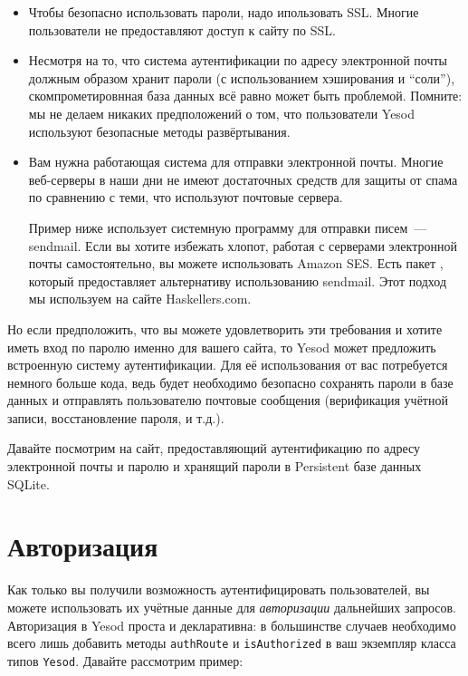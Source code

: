 \begin{itemize}
    \item Чтобы безопасно использовать пароли, надо ипользовать SSL. Многие пользователи не предоставляют доступ к сайту по SSL.

    \item Несмотря на то, что система аутентификации по адресу электронной почты должным образом хранит пароли (с использованием хэширования и ``соли''), скомпрометировнная база данных всё равно может быть проблемой. Помните: мы не делаем никаких предположений о том, что пользователи Yesod используют безопасные методы развёртывания.

    \item Вам нужна работающая система для отправки электронной почты. Многие веб-серверы в наши дни не имеют достаточных средств для защиты от спама по сравнению с теми, что используют почтовые сервера.

    \begin{remark}
    Пример ниже использует системную программу для отправки писем~--- sendmail. Если вы хотите избежать хлопот, работая с серверами электронной почты самостоятельно, вы можете использовать Amazon SES. Есть пакет , который предоставляет альтернативу использованию sendmail. Этот подход мы используем на сайте Haskellers.com.
    \end{remark}
\end{itemize}

Но если предположить, что вы можете удовлетворить эти требования и хотите иметь вход по паролю именно для вашего сайта, то Yesod может предложить встроенную систему аутентификации. Для её использования от вас потребуется немного больше кода, ведь будет необходимо безопасно сохранять пароли в базе данных и отправлять пользователю почтовые сообщения (верификация учётной записи, восстановление пароля, и т.д.).

Давайте посмотрим на сайт, предоставляющий аутентификацию по адресу электронной почты и паролю и хранящий пароли в Persistent базе данных SQLite.


\section{Авторизация}

Как только вы получили возможность аутентифицировать пользователей, вы можете использовать их учётные данные для \emph{авторизации} дальнейших запросов. Авторизация в Yesod проста и декларативна: в большинстве случаев необходимо всего лишь добавить методы \lstinline'authRoute' и \lstinline'isAuthorized' в ваш экземпляр класса типов \lstinline'Yesod'. Давайте рассмотрим пример:

